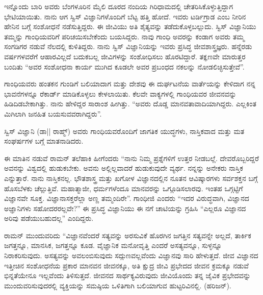 ಇನ್ನೊಂದು ಬಾರಿ ಅವರು ಬೆಂಗಳೂರಿನ  ಮೈಲಿ ದೂರದ ನಂದಿಯ ಗಿರಿಧಾಮದಲ್ಲಿ ಚೇತರಿಸಿಕೊಳ್ಳುತ್ತಿದ್ದಾಗ ಭೇಟಿಯಾಯಿತು. ನಾನು ಆಗ ಸ್ವಿಸ್ ವಿಜ್ಞಾನಿಗಳೊಂದಿಗೆ ಬೆಟ್ಟ ಹತ್ತಿ ಹೋದೆ. ಇವರು ಟರ್ಡಿಗ್ರಾಡ ಎಂಬ ನೀರಿನ ಹೇನಿನ ಬಗ್ಗೆ ಸಂಶೋಧನೆ ನಡೆಸುತ್ತಿದ್ದರು. ಈ ಜೀವಿಯು ಅತಿ ಶೈತ್ಯವನ್ನು ತಡೆದುಕೊಳ್ಳಬಲ್ಲುದು. ಸ್ವಿಸ್ ವಿಜ್ಞಾನಿಯು ತಮ್ಮನ್ನು ಗಾಂಧಿಯವರಿಗೆ ಪರಿಚಯಿಸಬೇಕೆಂದು ಬಯಸಿದ್ದರು. ನಾವು ಗಾಂಧಿ ಅವರನ್ನು ಕಂಡಾಗ ಅವರು ತಮ್ಮ ಸಂಗಡಿಗರ ನಡುವೆ ನೆಲದಲ್ಲಿ ಕುಳಿತಿದ್ದರು. ನಾನು ಸ್ವಿಸ್ ವಿಜ್ಞಾನಿಯನ್ನು ಇವರು ಪ್ರಸಿದ್ಧ ಜೀವಶಾಸ್ತ್ರಜ್ಞರು. ಹನ್ನೆರಡು ವರ್ಷಗಳವರೆಗೆ ಆಹಾರವಿಲ್ಲದೆ ಬದುಕಬಲ್ಲ ಜೀವಿಗಳನ್ನು ಸಂಶೋಧಿಸಲು ಹೊರಟಿದ್ದಾರೆ. ತಕ್ಞಣವೇ ಮಾರುತ್ತರ ಬಂದಿತು “ಅವರ ಸಂಶೋಧನಾ ಕಾರ್ಯ ಮುಗಿದ ಕೂಡಲೇ ಅವರ ಪ್ರಬಂಧದ ನಕಲನ್ನು ನೋಡಲಿಚ್ಛಿಸುತ್ತೇವೆ”.

ಗಾಂಧಿಯವರು ಹಂತಕನ ಗುಂಡಿಗೆ ಬಲಿಯಾದಾಗ ಮತ್ತು ದೇಶವು ಈ ದುರ್ಘಟನೆಯ ವಾರ್ತೆಯನ್ನು ಕೇಳಿದಾಗ ನನ್ನ ಭಾವನೆಗಳನ್ನೂ ರೆಕಾರ್ಡ್ ಮಾಡಿಕೊಳ್ಳಲು ಕೇಳಲಾಯಿತು. ಕೆಲವೇ ವಾಕ್ಯಗಳಲ್ಲಿ ಗಾಂಧಿಯವರ ಜೀವನವನ್ನು ಹಿಡಿದಿಡಬೇಕಾಗಿತ್ತು. ನಾನು ಹೇಳಿದ್ದರ ಸಾರಾಂಶ ಹೀಗಿತ್ತು. “ಅವರು ದೊಡ್ಡ ಮಾನವತಾವಾದಿಯಾಗಿದ್ದರು. ಎಲ್ಲಕಿಂತ ಮಿಗಿಲಾಗಿ ಜನಹಿತ ಬಯಸುವವರಾಗಿದ್ದರು”.

ಸ್ವಿಸ್ ವಿಜ್ಞಾನಿ (ಡಾ|| ರಾಹ್ಮ್) ಅವರು ಗಾಂಧಿಯವರೊಂದಿಗೆ ಜಾಗತಿಕ ಯುದ್ಧಗಳು, ನಾಸ್ತಿಕವಾದ ಮತ್ತು ಮತ ಸಂಘರ್ಷಗಳ ಬಗ್ಗೆ ಮಾತನಾಡಿದರು.

ಈ ಮಾತಿನ ನಡುವೆ ರಾಮನ್ ತಲೆಹಾಕಿ ಹೀಗೆಂದರು “ನಾನು ನಿಮ್ಮ ಪ್ರಶ್ನೆಗಳಿಗೆ ಉತ್ತರ ನೀಡಬಲ್ಲೆ. ದೇವರೊಬ್ಬರಿದ್ದರೆ ಅವನನ್ನು ವಿಶ್ವದಲ್ಲಿ ಹುಡುಕಬೇಕು. ಅವನು ಅಲ್ಲಿಲ್ಲವಾದರೆ ಹುಡುಕುವುದೇ ವ್ಯರ್ಥ. ನನ್ನನ್ನು ಅನೇಕರು ನಾಸ್ತಿಕ ಎನ್ನುತ್ತಾರೆ. ನಾನು ನಾಸ್ತಿಕನಲ್ಲ. ಭೌತಶಾಸ್ತ್ರ ಮತ್ತು ಖಗೋಳ ವಿಜ್ಞಾನದಲ್ಲಿನ ನೂತನ ಆವಿಷ್ಕಾರಗಳು ಸರ್ವಶಕ್ತನ ಬಗ್ಗೆ ಹೊಸಬೆಳಕು ಚೆಲ್ಲುತ್ತಿವೆ. ಮಹಾತ್ಮಾಜೀ, ಧರ್ಮಗಳೆಂದೂ ಮಾನವರನ್ನು ಒಗ್ಗೂಡಿಸಲಾರವು. ಇಂತಹ ಒಗ್ಗಟ್ಟಿಗೆ ವಿಜ್ಞಾನವೇ ಸೂಕ್ತ. ವಿಜ್ಞಾನಾಸಕ್ತರೆಲ್ಲಾ ಅಣ್ಣ ತಮ್ಮಂದಿರೇ”. ಗಾಂಧೀಜಿ ಎಂದರು\enginline{-} “ಇದರ ವಿರುದ್ಧವಾಗಿ, ವಿಜ್ಞಾನದ ಅಜ್ಞಾನಿಗಳು ಸಹೋದರರಲ್ಲವೇ?” ಈ ಪ್ರಸಿದ್ಧ ವಿಜ್ಞಾನಿಯು ಈ ನಗೆ ಚಾಟಿಯನ್ನು ಗ್ರಹಿಸಿ \enginline{-} “ಎಲ್ಲರೂ ವಿಜ್ಞಾನದ ಅರಿವು ಪಡೆಯುಬಹುದಲ್ಲ” ಎಂದಿದ್ದರು.

ರಾಮನ್ ಮುಂದುವರಿದು \enginline{-} “ವಿಜ್ಞಾನವೆಂದರೆ ಸತ್ಯವನ್ನು ಅರಸುವಿಕೆ \enginline{-} ಹೊರಗಿನ ಜಗತ್ತಿನ ಸತ್ಯವನ್ನೇ ಅಲ್ಲದೆ, ತಾರ್ಕಿಕ ಜಗತ್ತನ್ನೂ, ಮಾನಸಿಕ, ಜಗತ್ತನ್ನೂ ಕೂಡ. ವೈಜ್ಞಾನಿಕ ಮನೋವೃತ್ತಿ ಎಂದರೆ ಅಸತ್ಯವನ್ನೂ, ಸುಳ್ಳನ್ನೂ ನಿರಾಕರಿಸುವುದು. ಅಸತ್ಯವನ್ನು ಅವಲಂಬಿಸುವುದು ಸದ್ಗುಣವಲ್ಲವೆಂದು ವಿಜ್ಞಾನವು ಸಾರಿ ಹೇಳುತ್ತದೆ. ಜೀವ ವಿಜ್ಞಾನದ ಇತ್ತೀಚಿನ ಸಂಶೋಧನೆಯ ಪ್ರಕಾರ ಮಾನವನ ಜೀವನಕ್ಕೂ, ಅತಿ ಕ್ಷುದ್ರ ಜೀವಿ ಪ್ರಭೇದದ ಜೀವನ ಕ್ರಮಕ್ಕೂ ನಡುವೆ ಭಿನ್ನತೆಯೇನೂ ಇಲ್ಲವೆಂದು ತಿಳಿಸುತ್ತದೆ. ಜೀವನದ ಸಾರ್ಥಕ್ಯವಿರುವುದು ಜೀವಿಯೊಂದು ತನ್ನ ಜೈವಿಕ ಪ್ರಭೇದವನ್ನು ಮುಂದುವರಿಸುವುದರಲ್ಲಿ \enginline{-} ವ್ಯಕ್ತಿಯನ್ನು ಸಮಷ್ಠಿಯ ಒಳಿತಿಗಾಗಿ ಬಲಿಯಾಗುವ ಹುಟ್ಟರಿವಿನಲ್ಲಿ. (ಹರಿಜನ್\enginline{-}).

